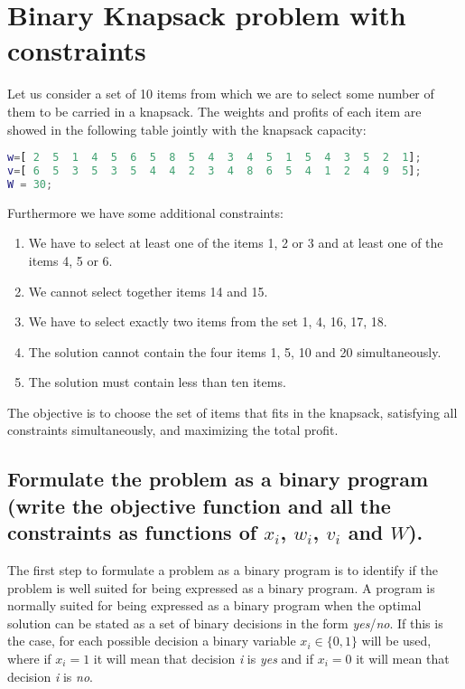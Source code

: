\chapter{Binary Knapsack problem with constraints}
\label{ch:Example}

Let us consider a set of 10 items from which we are to select some number of them to be carried in a knapsack. The weights and profits of each item are showed in the following table jointly with the knapsack capacity:
\begin{lstlisting}[language=Matlab,frame=none]
% Object data
w=[ 2  5  1  4  5  6  5  8  5  4  3  4  5  1  5  4  3  5  2  1]; 		% weights
v=[ 6  5  3  5  3  5  4  4  2  3  4  8  6  5  4  1  2  4  9  5]; 		% values
W = 30;    																% Knapsack capacity	
\end{lstlisting}
Furthermore we have some additional constraints:
\begin{enumerate}
\item We have to select at least one of the items 1, 2 or 3 and at least one of the items 4, 5 or 6.
\item We cannot select together items 14 and 15.
\item We have to select exactly two items from the set {1, 4, 16, 17, 18}.
\item The solution cannot contain the four items 1, 5, 10 and 20 simultaneously.
\item The solution must contain less than ten items.
\end{enumerate}
The objective is to choose the set of items that fits in the knapsack, satisfying all constraints simultaneously, and maximizing the total profit.

\section{Formulate the problem as a binary program (write the objective function and all the constraints as functions of $x_i$, $w_i$, $v_i$ and $W$).}

The first step to formulate a problem as a binary program is to identify if the problem is well suited for being expressed as a binary program. A program is normally suited for being expressed as a binary program when the optimal solution can be stated as a set of binary decisions in the form \textit{yes}/\textit{no}. If this is the case, for each possible decision a binary variable $x_i\in\lbrace 0,1 \rbrace$ will be used, where if $x_i=1$ it will mean that decision \textit{i} is \textit{yes} and if $x_i=0$  it will mean that decision \textit{i} is \textit{no}.

